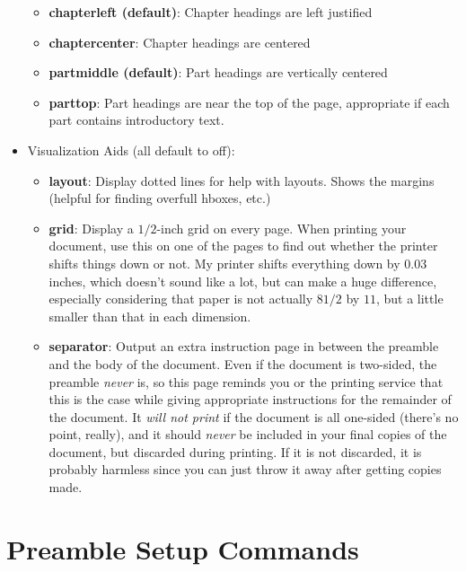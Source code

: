 \documentclass[phd,electronic,twosidetoc,letterpaper,chaptercenter,parttop,lol,lof,lot]{byumsphd}
\begin{document}
\begin{itemize}
\begin{itemize}
            \item \textbf{chapterleft (default)}: Chapter headings are left justified
            \item \textbf{chaptercenter}: Chapter headings are centered
            \item \textbf{partmiddle (default)}: Part headings are vertically centered
            \item \textbf{parttop}: Part headings are near the top of the page, appropriate if each part contains introductory text.
        \end{itemize}
\pagebreak
    \item Visualization Aids (all default to off):
        \begin{itemize}
            \item \textbf{layout}: Display dotted lines for help with layouts.  Shows the margins (helpful for finding overfull hboxes, etc.)
            \item \textbf{grid}: Display a \( 1/2 \)-inch grid on every page.  When printing your document, use this on one of the pages to find out whether the printer shifts things down or not.  My printer shifts everything down by \( 0.03 \) inches, which doesn't sound like a lot, but can make a huge difference, especially considering that paper is not actually \( 8 1/2 \) by \( 11 \), but a little smaller than that in each dimension.
            \item \textbf{separator}: Output an extra instruction page in between the preamble and the body of the document.  Even if the document is two-sided, the preamble \emph{never} is, so this page reminds you or the printing service that this is the case while giving appropriate instructions for the remainder of the document.  It \emph{will not print} if the document is all one-sided (there's no point, really), and it should \emph{never} be included in your final copies of the document, but discarded during printing.  If it is not discarded, it is probably harmless since you can just throw it away after getting copies made.
        \end{itemize}
\end{itemize}

\section{Preamble Setup Commands}
\end{document}
